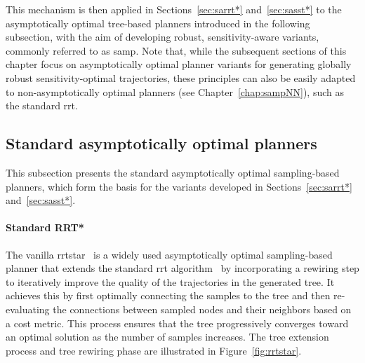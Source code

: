 This mechanism is then applied in Sections~\ref{sec:sarrt*} and~\ref{sec:sasst*} to the asymptotically optimal tree-based planners introduced in the following subsection, with the aim of developing robust, sensitivity-aware variants, commonly referred to as \gls{samp}. 
Note that, while the subsequent sections of this chapter focus on asymptotically optimal planner variants for generating globally robust sensitivity-optimal trajectories, these principles can also be easily adapted to non-asymptotically optimal planners (see Chapter~\ref{chap:sampNN}), such as the standard \gls{rrt}.

\subsection{Standard asymptotically optimal planners}\label{sec:standard_planners}

This subsection presents the standard asymptotically optimal sampling-based planners, which form the basis for the  variants developed in Sections~\ref{sec:sarrt*} and~\ref{sec:sasst*}.

\paragraph{Standard RRT*}

The vanilla \gls{rrtstar}~\cite{cRRTstar} is a widely used asymptotically optimal sampling-based planner that extends the standard \gls{rrt} algorithm~\cite{cRRT} by incorporating a rewiring step to iteratively improve the quality of the trajectories in the generated tree.
It achieves this by first optimally connecting the samples to the tree and then re-evaluating the connections between sampled nodes and their neighbors based on a cost metric. 
This process ensures that the tree progressively converges toward an optimal solution as the number of samples increases.
The  tree extension process and tree rewiring phase are illustrated in Figure~\ref{fig:rrtstar}.

